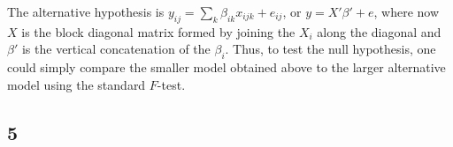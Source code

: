 \documentclass{article}
\begin{document}
The alternative hypothesis is $y_{ij}=\sum_k\beta_{ik}x_{ijk}+e_{ij}$, or $y=X'\beta'+e$, where now $X$ is the block diagonal matrix formed by joining the $X_i$ along the diagonal and $\beta'$ is the vertical concatenation of the $\beta_i$. Thus, to test the null hypothesis, one could simply compare the smaller model obtained above to the larger alternative model using the standard $F$-test.
\subsection*{5}
\end{document}
